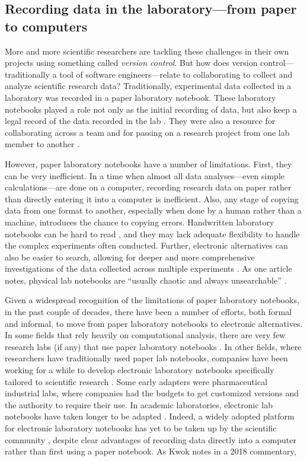 \documentclass[]{tufte-book}
\begin{document}
\subsection{Recording data in the laboratory---from paper to computers}\label{recording-data-in-the-laboratoryfrom-paper-to-computers}

More and more scientific researchers are tackling these challenges in their own
projects using something called \emph{version control}. But how does version
control---traditionally a tool of software engineers---relate to collaborating
to collect and analyze scientific research data? Traditionally, experimental
data collected in a laboratory was recorded in a paper laboratory notebook.
These laboratory notebooks played a role not only as the initial recording of
data, but also keep a legal record of the data recorded in the lab
\citep{mascarelli2014research}. They were also a resource for collaborating across a
team and for passing on a research project from one lab member to another
\citep{butler2005electronic}.

However, paper laboratory notebooks have a number of limitations. First, they
can be very inefficient. In a time when almost all data analyses---even simple
calculations---are done on a computer, recording research data on paper rather
than directly entering it into a computer is inefficient. Also, any stage of
copying data from one format to another, especially when done by a human rather
than a machine, introduces the chance to copying errors. Handwritten laboratory
notebooks can be hard to read \citep{butler2005electronic, perkel2011coding}, and
they may lack adequate flexibility to handle the complex experiments often
conducted. Further, electronic alternatives can also be easier to search,
allowing for deeper and more comprehensive investigations of the data collected
across multiple experiments \citep{giles2012digital, butler2005electronic, perkel2011coding}. As one article notes, physical lab notebooks are ``usually
chaotic and always unsearchable'' \citep{perkel2011coding}.

Given a widespread recognition of the limitations of paper laboratory notebooks,
in the past couple of decades, there have been a number of efforts, both formal
and informal, to move from paper laboratory notebooks to electronic
alternatives. In some fields that rely heavily on computational analysis, there
are very few research labs (if any) that use paper laboratory notebooks
\citep{butler2005electronic}. In other fields, where researchers have traditionally
used paper lab notebooks, companies have been working for a while to develop
electronic laboratory notebooks specifically tailored to scientific research
\citep{giles2012digital}. Some early adapters were pharmaceutical industrial
labs, where companies had the budgets to get customized versions and the
authority to require their use. In academic laboratories, electronic lab
notebooks have taken longer to be adapted \citep{giles2012digital, butler2005electronic}. Indeed, a widely adopted platform for electronic laboratory
notebooks has yet to be taken up by the scientific community \citep{kwok2018lab},
despite clear advantages of recording data directly into a computer rather than
first using a paper notebook. As Kwok notes in a 2018 commentary,
\end{document}
